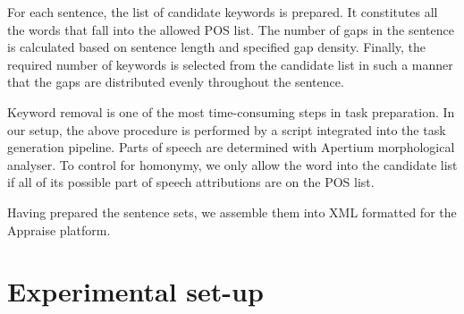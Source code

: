 \documentclass[11pt]{article}
\begin{document}
For each sentence, the list of candidate keywords is prepared. It constitutes all the words that 
fall into the allowed POS list. The number of gaps in the sentence is calculated based on 
sentence length and specified gap density. Finally, the required number of keywords is selected 
from the candidate list in such a manner that the gaps are distributed evenly throughout the sentence.

Keyword removal is one of the most time-consuming steps in task preparation. In our setup, the above procedure is performed by a script integrated into the task generation pipeline. Parts of speech are determined with Apertium morphological analyser. To control for homonymy, we only allow the word into the candidate list if all of its possible part of speech attributions are on the POS list. 

Having prepared the sentence sets, we assemble them into XML formatted for the Appraise platform.

%

\section{Experimental set-up}
\label{sec:setup}
\end{document}
